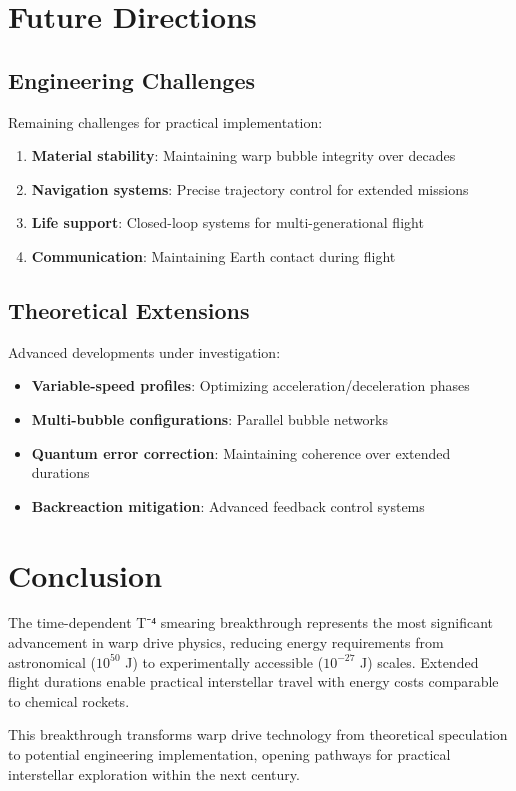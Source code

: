\documentclass[12pt,a4paper]{article}
\begin{document}
\section{Future Directions}

\subsection{Engineering Challenges}

Remaining challenges for practical implementation:

\begin{enumerate}
\item \textbf{Material stability}: Maintaining warp bubble integrity over decades
\item \textbf{Navigation systems}: Precise trajectory control for extended missions
\item \textbf{Life support}: Closed-loop systems for multi-generational flight
\item \textbf{Communication}: Maintaining Earth contact during flight
\end{enumerate}

\subsection{Theoretical Extensions}

Advanced developments under investigation:

\begin{itemize}
\item \textbf{Variable-speed profiles}: Optimizing acceleration/deceleration phases
\item \textbf{Multi-bubble configurations}: Parallel bubble networks
\item \textbf{Quantum error correction}: Maintaining coherence over extended durations
\item \textbf{Backreaction mitigation}: Advanced feedback control systems
\end{itemize}

\section{Conclusion}

The time-dependent T⁻⁴ smearing breakthrough represents the most significant advancement in warp drive physics, reducing energy requirements from astronomical ($10^{50}$ J) to experimentally accessible ($10^{-27}$ J) scales. Extended flight durations enable practical interstellar travel with energy costs comparable to chemical rockets.

This breakthrough transforms warp drive technology from theoretical speculation to potential engineering implementation, opening pathways for practical interstellar exploration within the next century.
\end{document}
